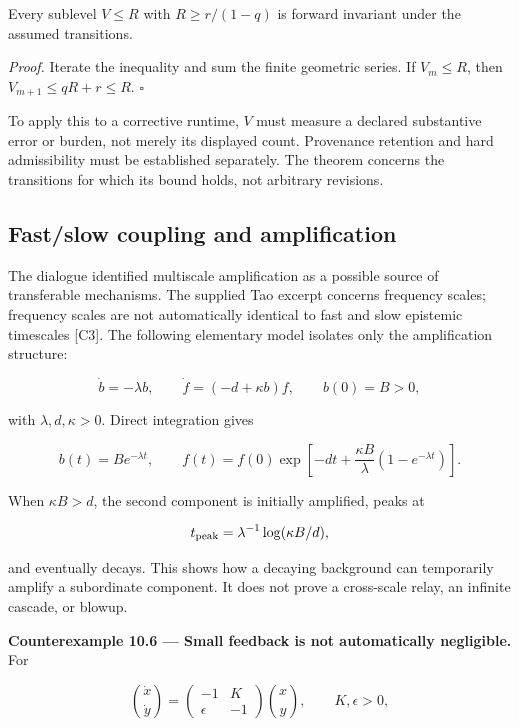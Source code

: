 \documentclass[11pt,a4paper]{article}
\begin{document}
Every sublevel \(V\leq R\) with \(R\geq r/(1-q)\) is forward invariant
under the assumed transitions.

\emph{Proof.} Iterate the inequality and sum the finite geometric
series. If \(V_m\leq R\), then \(V_{m+1}\leq qR+r\leq R\). \(\square\)

To apply this to a corrective runtime, \(V\) must measure a declared
substantive error or burden, not merely its displayed count. Provenance
retention and hard admissibility must be established separately. The
theorem concerns the transitions for which its bound holds, not
arbitrary revisions.

\subsection{Fast/slow coupling and
amplification}\label{fastslow-coupling-and-amplification}

The dialogue identified multiscale amplification as a possible source of
transferable mechanisms. The supplied Tao excerpt concerns frequency
scales; frequency scales are not automatically identical to fast and
slow epistemic timescales {[}C3{]}. The following elementary model
isolates only the amplification structure:

\nopagebreak[4]

\[\dot b=-\lambda b,\qquad
\dot f=(-d+\kappa b)f,
\qquad b(0)=B>0,\]

with \(\lambda,d,\kappa>0\). Direct integration gives

\nopagebreak[4]

\[b(t)=Be^{-\lambda t},\qquad
f(t)=f(0)\exp\!\left[-dt+\frac{\kappa B}{\lambda}(1-e^{-\lambda t})\right].\]

When \(\kappa B>d\), the second component is initially amplified, peaks
at

\nopagebreak[4]

\[t_{\rm peak}=\lambda^{-1}\log(\kappa B/d),\]

and eventually decays. This shows how a decaying background can
temporarily amplify a subordinate component. It does not prove a
cross-scale relay, an infinite cascade, or blowup.


\textbf{Counterexample 10.6 --- Small feedback is not automatically
negligible.} For

\nopagebreak[4]

\[\binom{\dot x}{\dot y}=
\begin{pmatrix}-1&K\\ \epsilon&-1\end{pmatrix}\binom{x}{y},
\qquad K,\epsilon>0,\]
\end{document}
